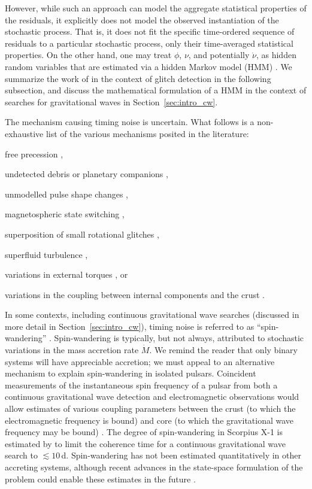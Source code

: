 However, while such an approach can model the aggregate statistical properties of the residuals, it explicitly does not model the observed instantiation of the stochastic process. That is, it does not fit the specific time-ordered sequence of residuals to a particular stochastic process, only their time-averaged statistical properties. On the other hand, one may treat $\phi$, $\nu$, and potentially $\dot{\nu}$, as hidden random variables that are estimated via a hidden Markov model (HMM) \citep{Melatos2020hmm}. We summarize the work of \citet{Melatos2020hmm} in the context of glitch detection in the following subsection, and discuss the mathematical formulation of a HMM in the context of searches for gravitational waves in Section~\ref{sec:intro_cw}.

The mechanism causing timing noise is uncertain. What follows is a non-exhaustive list of the various mechanisms posited in the literature:
\begin{enumerate*}
\item free precession \citep{Stairs2000,Brook2013,Kerr2016},
\item undetected debris or planetary companions \citep{Cordes2008,Kerr2015},
\item unmodelled pulse shape changes \citep{Brook2016,Shannon2016},
\item magnetospheric state switching \citep{Kramer2006,Lyne2010},
\item superposition of small rotational glitches \citep{Cheng1987b,Melatos2008},
\item superfluid turbulence \citep{Greenstein1970,Link2012,Melatos2014},
\item variations in external torques \citep{Cordes1981,Cheng1987a}, or
\item variations in the coupling between internal components and the crust \citep{Jones1990}.
\end{enumerate*}

In some contexts, including continuous gravitational wave searches (discussed in more detail in Section~\ref{sec:intro_cw}), timing noise is referred to as ``spin-wandering'' \citep{Bildsten1998,Leaci2015,Suvorova2016,Mukherjee2018}. Spin-wandering is typically, but not always, attributed to stochastic variations in the mass accretion rate $\dot{M}$. We remind the reader that only binary systems will have appreciable accretion; we must appeal to an alternative mechanism to explain spin-wandering in isolated pulsars. Coincident measurements of the instantaneous spin frequency of a pulsar from both a continuous gravitational wave detection and electromagnetic observations would allow estimates of various coupling parameters between the crust (to which the electromagnetic frequency is bound) and core (to which the gravitational wave frequency may be bound) \citep{Meyers2021,Meyers2021a}. The degree of spin-wandering in Scorpius X-1 is estimated by \citet{Mukherjee2018} to limit the coherence time for a continuous gravitational wave search to $\lesssim 10\,$d. Spin-wandering has not been estimated quantitatively in other accreting systems, although recent advances in the state-space formulation of the problem could enable these estimates in the future \citep{Melatos2023}.

